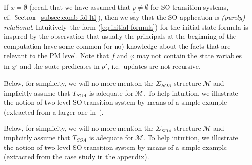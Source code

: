 \documentclass[conference]{IEEEtran}
\newcommand{\secref}[1]{Section~\ref{#1}}
\begin{document}
If $\underline{x}=\emptyset$ (recall that we have assumed that
$\underline{p}\neq \emptyset$ for SO transition systems,
cf.~\secref{subsec:comb-fol-ltl}), then we say that the SO application
is \emph{(purely) relational}.  Intuitively, the form
(\ref{eq:initial-formula}) for the initial state formula is inspired by
the observation that usually the principals at the beginning of the
computation have some common (or no) knowledge about the facts that
are relevant to the PM level.  Note that $\underline{f}$ and
$\underline{\varphi}$ may not contain the state variables in
$\underline{x}'$ and the state predicates in $\underline{p}'$, i.e.\
updates are not recursive.  

\begin{SHORT}
Below, for simplicity, we will no more mention the
$\Sigma_\mathit{SOA}$-structure $\mathcal{M}$ and implicitly assume
that $T_\mathit{SOA}$ is adequate for $\mathcal{M}$.  To help
intuition, we illustrate the notion of two-level SO transition system
by means of a simple example (extracted from a larger one
in~\cite{BRV-TR09}).
\end{SHORT}
\begin{LONG}
Below, for simplicity, we will no more mention the
$\Sigma_\mathit{SOA}$-structure $\mathcal{M}$ and implicitly assume
that $T_\mathit{SOA}$ is adequate for $\mathcal{M}$.  To help
intuition, we illustrate the notion of two-level SO transition system
by means of a simple example (extracted from the case study in the appendix).
\end{LONG}
\end{document}
